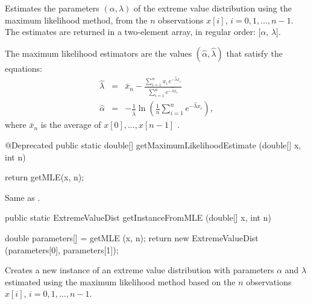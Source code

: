 \begin{tabb}
   Estimates the parameters $(\alpha,\lambda)$ of the extreme value distribution
   using the maximum likelihood method, from the $n$ observations
   $x[i]$, $i = 0, 1,\ldots, n-1$. The estimates are returned in a two-element
    array, in regular order: [$\alpha$, $\lambda$].
   \begin{detailed}
   The maximum likelihood estimators are the values $(\hat\alpha, \hat\lambda)$
   that satisfy the equations:
   \begin{eqnarray*}
      \hat{\lambda} & = & \bar{x}_n - \frac{\sum_{i=1}^{n} x_i\,
   e^{- \hat{\lambda} x_i}}{\sum_{i=1}^{n} e^{-\hat{\lambda} x_i}}\\[0.5em]
      \hat{\alpha} & = & - \frac{1}{\hat{\lambda}} \ln \left( \frac{1}{n}
    \sum_{i=1}^{n} e^{-\hat{\lambda} x_i} \right),
   \end{eqnarray*}
   where $\bar x_n$ is the average of $x[0],\dots,x[n-1]$ \cite[page 89]{tEVA00a}.
   \end{detailed}
\end{tabb}
\begin{htmlonly}
\end{htmlonly}
\begin{code}

   @Deprecated
   public static double[] getMaximumLikelihoodEstimate (double[] x, int n)\begin{hide} {
      return getMLE(x, n);
   }\end{hide}
\end{code}
\begin{tabb} Same as .
\end{tabb}
\begin{code}

   public static ExtremeValueDist getInstanceFromMLE (double[] x, int n)\begin{hide} {
      double parameters[] = getMLE (x, n);
      return new ExtremeValueDist (parameters[0], parameters[1]);
   }\end{hide}
\end{code}
\begin{tabb}
   Creates a new instance of an extreme value distribution with parameters $\alpha$ and
   $\lambda$ estimated using the maximum likelihood method based on the $n$ observations
   $x[i]$, $i = 0, 1, \ldots, n-1$.
\end{tabb}
